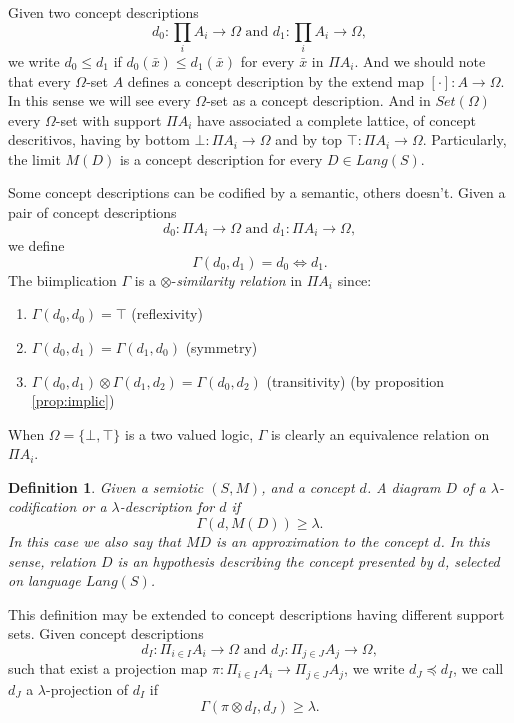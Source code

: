 \documentclass[oribibl]{llncs}
\newtheorem{defn}{Definition}
\begin{document}
Given two concept descriptions \[d_0:\prod_i A_i\rightarrow\Omega \text{ and } d_1:\prod_i A_i\rightarrow\Omega,\] we write $d_0\leq d_1$ if $d_0(\bar{x})\leq d_1(\bar{x})$ for every $\bar{x}$ in $\Pi A_i$. And we should note that every $\Omega$-set $A$ defines a concept description by the extend map $[\cdot]:A\rightarrow \Omega$. In this sense we will see every $\Omega$-set as a concept description. And in $Set(\Omega)$ every $\Omega$-set with support $\Pi A_i$ have associated a complete lattice, of concept descritivos, having by bottom $\bot:\Pi A_i\rightarrow \Omega$ and by top $\top:\Pi A_i\rightarrow \Omega$. Particularly, the limit $M(D)$ is a concept description for every $D\in Lang(S)$.

Some concept descriptions can be codified by a semantic, others doesn't. Given a pair of concept descriptions \[d_0:\Pi
A_i\rightarrow\Omega\text{ and }d_1:\Pi A_i\rightarrow\Omega,\]
we define
\[\Gamma(d_0,d_1)=d_0\Leftrightarrow d_1.\] The biimplication $\Gamma$ is a $\otimes$-\emph{similarity
relation} in $\Pi A_i$ since:
\begin{enumerate}
  \item $\Gamma(d_0,d_0)=\top$ (reflexivity)
  \item $\Gamma(d_0,d_1)=\Gamma(d_1,d_0)$ (symmetry)
  \item $\Gamma(d_0,d_1)\otimes\Gamma(d_1,d_2)=\Gamma(d_0,d_2)$
  (transitivity) (by proposition \ref{prop:implic})
\end{enumerate}
When $\Omega=\{\bot,\top\}$ is a two valued logic, $\Gamma$ is clearly an equivalence relation
on $\Pi A_i$.

\begin{defn}
Given a semiotic $(S,M)$, and a concept $d$. A diagram $D$ of a $\lambda$-codification or a $\lambda$-description for $d$ if
\[
\Gamma(d,M(D))\geq \lambda.
\]
In this case we also say that $MD$ is an approximation to the concept $d$. In this sense, relation $D$ is an hypothesis describing the concept presented by $d$, selected on language $Lang(S)$.
\end{defn}

This definition may be extended to concept descriptions having different support sets. Given concept descriptions
\[d_I:\Pi_{i\in I} A_i\rightarrow\Omega\text{ and }d_J:\Pi_{j\in J} A_j\rightarrow\Omega,\] such that exist a projection map $\pi:\Pi_{i\in I} A_i\rightarrow\Pi_{j\in J} A_j$, we write $d_J\preceq d_I$, we call $d_J$ a $\lambda$-projection of $d_I$ if
\[
\Gamma(\pi\otimes d_I, d_J)\geq \lambda.
\]
\end{document}
